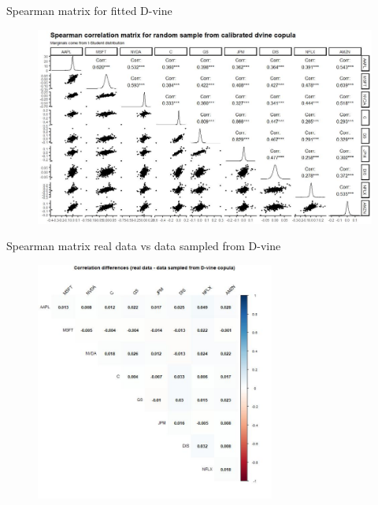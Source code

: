 \documentclass{beamer}
\begin{document}
\begin{frame}{Spearman matrix for fitted D-vine}
\centering
\begin{figure}[!h]
  \centering
    \includegraphics[width=1\textwidth]{figures/correlation/spearman_copula_dvine_seed_123.jpeg}
\end{figure}
    
\end{frame}

\begin{frame}{Spearman matrix real data vs data sampled from D-vine}

\centering
\begin{figure}[!h]
  \centering
    \includegraphics[width=0.7\textwidth]{figures/correlation/spearman_real_data_vs_dvine_copula.jpeg}
\end{figure}
    
\end{frame}
\end{document}
